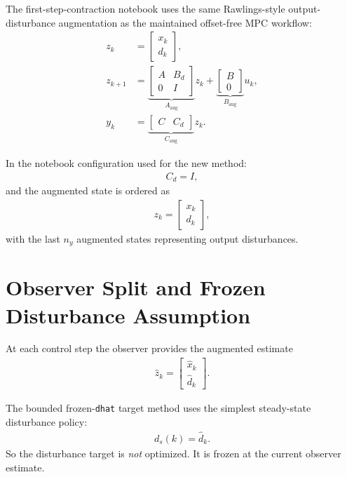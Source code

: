 \documentclass[11pt]{article}
\begin{document}
The first-step-contraction notebook uses the same Rawlings-style output-disturbance augmentation as the maintained offset-free MPC workflow:
\begin{align}
z_k &=
\begin{bmatrix}
x_k \\
d_k
\end{bmatrix}, \\
z_{k+1} &=
\underbrace{\begin{bmatrix}
A & B_d \\
0 & I
\end{bmatrix}}_{A_{\mathrm{aug}}}
z_k
+
\underbrace{\begin{bmatrix}
B \\
0
\end{bmatrix}}_{B_{\mathrm{aug}}}
u_k, \\
y_k &=
\underbrace{\begin{bmatrix}
C & C_d
\end{bmatrix}}_{C_{\mathrm{aug}}}
z_k.
\end{align}

In the notebook configuration used for the new method:
\begin{align}
C_d = I,
\end{align}
and the augmented state is ordered as
\begin{align}
z_k = \begin{bmatrix} x_k \\ d_k \end{bmatrix},
\end{align}
with the last $n_y$ augmented states representing output disturbances.

\section{Observer Split and Frozen Disturbance Assumption}

At each control step the observer provides the augmented estimate
\begin{align}
\hat z_k =
\begin{bmatrix}
\hat x_k \\
\hat d_k
\end{bmatrix}.
\end{align}

The bounded frozen-\texttt{dhat} target method uses the simplest steady-state disturbance policy:
\begin{align}
d_s(k) = \hat d_k.
\end{align}
So the disturbance target is \emph{not} optimized. It is frozen at the current observer estimate.
\end{document}
